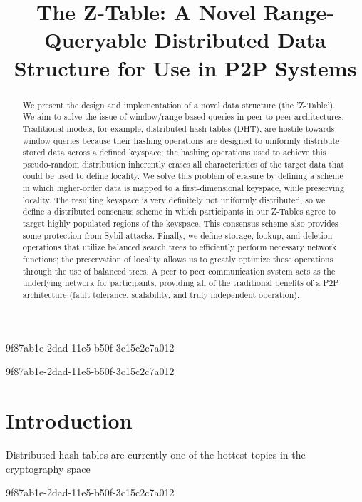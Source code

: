 \documentclass[12pt]{article}
\title{The Z-Table: A Novel Range-Queryable Distributed Data Structure for Use in P2P Systems}
\begin{document}
\maketitle

9f87ab1e-2dad-11e5-b50f-3c15c2c7a012\begin{abstract}
We present the design and implementation of a novel data structure (the 'Z-Table'). We aim to solve the issue of window/range-based queries in peer to peer architectures. Traditional models, for example,  distributed hash tables (DHT), are hostile towards window queries because their hashing operations are designed to uniformly distribute stored data across a defined keyspace; the hashing operations used to achieve this pseudo-random distribution inherently erases all characteristics of the target data that could be used to define locality. We solve this problem of erasure by defining a scheme in which higher-order data is mapped to a first-dimensional keyspace, while preserving locality. The resulting keyspace is very definitely not uniformly distributed, so we define a distributed consensus scheme in which participants in our Z-Tables agree to target highly populated regions of the keyspace. This consensus scheme also provides some protection from Sybil attacks. Finally, we define storage, lookup, and deletion operations that utilize balanced search trees to efficiently perform necessary network functions; the preservation of locality allows us to greatly optimize these operations through the use of balanced trees. A peer to peer communication system acts as the underlying network for participants, providing all of the traditional benefits of a P2P architecture (fault tolerance, scalability, and truly independent operation).
\end{abstract}
9f87ab1e-2dad-11e5-b50f-3c15c2c7a012

\newpage
\section{Introduction}
Distributed hash tables are currently one of the hottest topics in the cryptography space~\cite{Stoica:2001dj,Rowstron:2001ea,Ratnasamy:2001wn}

\printbibliography
9f87ab1e-2dad-11e5-b50f-3c15c2c7a012
\end{document}

